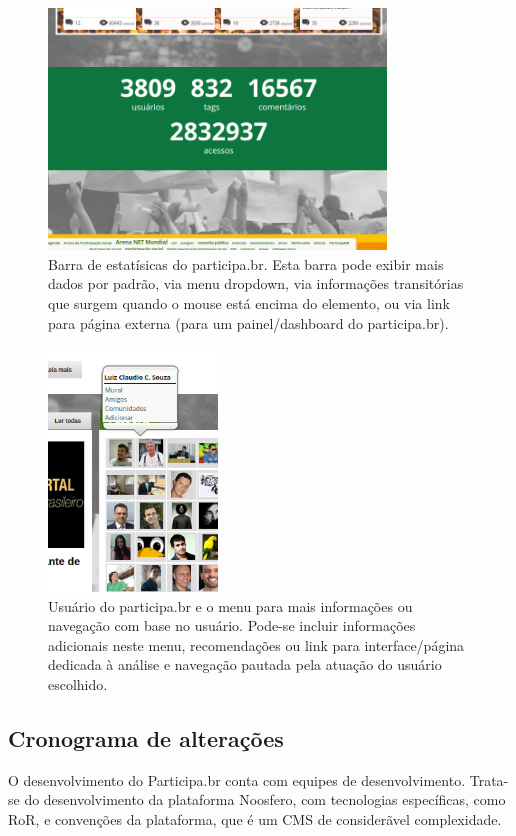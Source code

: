 \documentclass[12pt]{article}
\begin{document}
\begin{figure}[h!]
  \centering
      \includegraphics[width=0.8\textwidth]{screenshots/elp1}
  \caption{Barra de estatísicas do participa.br. Esta barra pode exibir mais dados por padrão, via menu dropdown, via informações transitórias que surgem quando o mouse está encima do elemento, ou via link para página externa (para um painel/dashboard do participa.br).}\label{fig:elp1}
\end{figure}

\begin{figure}[h!]
  \centering
      \includegraphics[width=0.4\textwidth]{screenshots/elp2}
  \caption{Usuário do participa.br e o menu para mais informações ou navegação com base no usuário. Pode-se incluir informações adicionais neste menu, recomendações ou link para interface/página dedicada à análise e navegação pautada pela atuação do usuário escolhido.}\label{fig:elp2}
\end{figure}



\subsection{Cronograma de alterações}\label{sec:cron}
O desenvolvimento do Participa.br conta com equipes de desenvolvimento. Trata-se do desenvolvimento da plataforma Noosfero, com tecnologias específicas, como RoR, e convenções da plataforma, que é um CMS de considerãvel complexidade.
\end{document}
